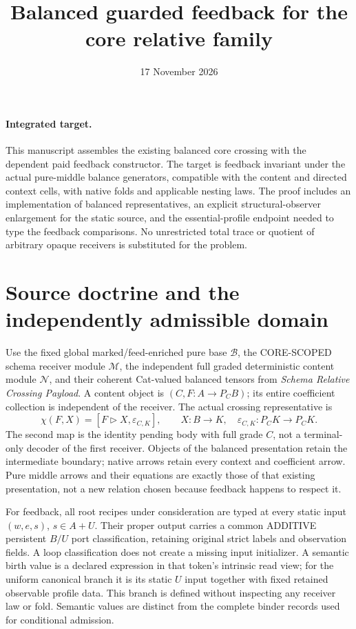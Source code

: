 \documentclass[11pt]{article}
\title{Balanced guarded feedback for the core relative family}
\date{17 November 2026}
\begin{document}
\maketitle
\paragraph{Integrated target.}
This manuscript assembles the existing balanced core crossing with the dependent paid feedback constructor. The target is feedback invariant under the actual pure-middle balance generators, compatible with the content and directed context cells, with native folds and applicable nesting laws. The proof includes an implementation of balanced representatives, an explicit structural-observer enlargement for the static source, and the essential-profile endpoint needed to type the feedback comparisons. No unrestricted total trace or quotient of arbitrary opaque receivers is substituted for the problem.

\section{Source doctrine and the independently admissible domain}
Use the fixed global marked/feed-enriched pure base $\mathcal B$, the CORE-SCOPED schema receiver module $\mathcal M$, the independent full graded deterministic content module $\mathcal N$, and their coherent Cat-valued balanced tensors from \emph{Schema Relative Crossing Payload}. A content object is $(C,F:A\to P_CB)$; its entire coefficient collection is independent of the receiver. The actual crossing representative is
\[
 \chi(F,X)=[F\triangleright X,\varepsilon_{C,K}],
 \qquad X:B\to K,
 \quad\varepsilon_{C,K}:P_CK\longrightarrow P_CK.
 \tag{1}
\]
The second map is the identity pending body with full grade $C$, not a terminal-only decoder of the first receiver. Objects of the balanced presentation retain the intermediate boundary; native arrows retain every context and coefficient arrow. Pure middle arrows and their equations are exactly those of that existing presentation, not a new relation chosen because feedback happens to respect it.

For feedback, all root recipes under consideration are typed at every static input $(w,e,s)$, $s\in A+U$. Their proper output carries a common ADDITIVE persistent $B/U$ port classification, retaining original strict labels and observation fields. A loop classification does not create a missing input initializer. A semantic birth value is a declared expression in that token's intrinsic read view; for the uniform canonical branch it is its static $U$ input together with fixed retained observable profile data. This branch is defined without inspecting any receiver law or fold. Semantic values are distinct from the complete binder records used for conditional admission.
\end{document}
